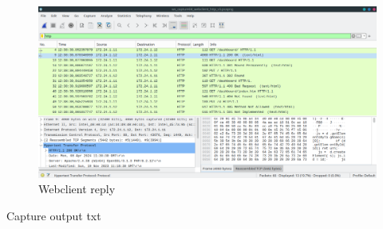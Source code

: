 \documentclass[11pt,a4paper]{report}
\begin{document}
\begin{flushleft}
\begin{flushleft}
                \begin{figure}[!h]
                    \centering
                    \includegraphics[scale=0.43]{wscapwcsocket06} %
                    \caption{Webclient reply} \label{fig:wireshark2}
                \end{figure}
            \end{flushleft}


            Capture output txt
        \end{flushleft}
\end{document}
